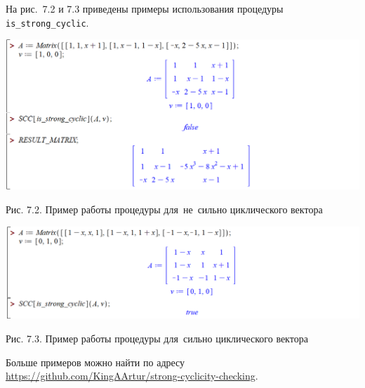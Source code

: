 \medskip
На рис.~7.2 и 7.3 приведены примеры использования процедуры \verb|is_strong_cyclic|.


\begin{center}
    \includegraphics[scale=0.6]{pictures/maple_example4.png}

    \small
    Рис. 7.2. Пример работы процедуры для~не~сильно циклического вектора
\end{center}


\begin{center}
    \includegraphics[scale=0.6]{pictures/maple_example1.png}

    \small
    Рис. 7.3. Пример работы процедуры для~сильно циклического вектора
\end{center}

Больше примеров можно найти по адресу\\
\url{https://github.com/KingAArtur/strong-cyclicity-checking}.